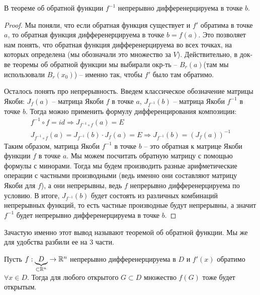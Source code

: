 \begin{follow}
    В теореме об обратной функции $f^{-1}$ непрерывно дифференерцируема в точке $b$.
\end{follow}
\begin{proof}
    Мы поняли, что если обратная функция существует и $f'$ обратима в точке $a$, то обратная функция дифференерцируема в точке $b = f(a)$.
    Это позволяет нам понять, что обратная функция дифференерцируема во всех точках, на которых определена (мы обозначали это множество за $V$).
    Действительно, в док-ве теоремы об обратной функции мы выбирали окр-ть -- $B_r(a)$(там мы использовали $B_r(x_0)$) -- именно так, чтобы $f'$ было там обратимо.
    
    \quad Осталось понять про непрерывность. 
    Введем классическое обозначение матрицы Якоби: $J_f(a)$ -- матрица Якоби $f$ в точке $a$, $J_{f^{-1}}(b)$ -- матрица Якоби $f^{-1}$ в точке $b$.
    Тогда можно применить формулу дифференцирования композиции:
    \begin{gather*}
        f^{-1} \circ f = id \Rightarrow J_{f^{-1} \circ f}(a) = E \\
        J_{f^{-1} \circ f}(a) = J_{f^{-1}}(b) \cdot J_f(a) = E \Rightarrow J_{f^{-1}}(b) = (J_f(a))^{-1} 
    \end{gather*}
    \quad Таким образом, матрица Якоби $f^{-1}$ в точке $b$ -- это обратная к матрице Якоби функции $f$ в точке $a$.
    Мы можем посчитать обратную матрицу с помощью формулы с минорами.
    Тогда мы будем производить разные арифметические операции с частными производными (ведь именно они составляют матрицу Якоби для $f$), а они непрерывны, ведь $f$ непрерывно дифференерцируема по условию.
    В итоге, $J_{f^{-1}}(b)$ будет состоять из различных комбинаций непрерывных функций, то есть частные производные будут непрерывны, а значит  $f^{-1}$ будет непрерывно дифференерцируема в точке $b$.
\end{proof}

\begin{notice}
    Зачастую именно этот вывод называют теоремой об обратной функции.
    Мы же для удобства разбили ее на 3 части.
\end{notice}

\vspace*{7mm}

\begin{follow}
    Пусть $f: \underbrace{D}_{\subset \mathbb{R}^n} \to \mathbb{R}^n$ непрерывно дифференерцируема в $D$ и $f'(x)$ обратимо $\forall x \in D$.
    Тогда для любого открытого $G \subset D$ множество $f(G)$ тоже будет открытым.
\end{follow}

